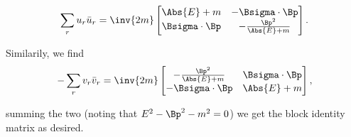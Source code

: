\begin{equation}\label{eqn:desaiDiracAdjoint:680}
\sum_r u_r \bar{u}_r 
=
\inv{2m}
\begin{bmatrix}
\Abs{E} + m & -\Bsigma \cdot \Bp \\
\Bsigma \cdot \Bp &
-\frac{\Bp^2}{\Abs{E} + m} 
\end{bmatrix}.
\end{equation}

Similarily, we find
\begin{equation}\label{eqn:desaiDiracAdjoint:700}
-\sum_r v_r \bar{v}_r 
=
\inv{2m}
\begin{bmatrix}
-\frac{\Bp^2}{\Abs{E} + m}  & \Bsigma \cdot \Bp \\
-\Bsigma \cdot \Bp  & \Abs{E} + m 
\end{bmatrix},
\end{equation}

summing the two (noting that $E^2 - \Bp^2 - m^2 = 0$) we get the block identity matrix as desired.

\EndArticle
